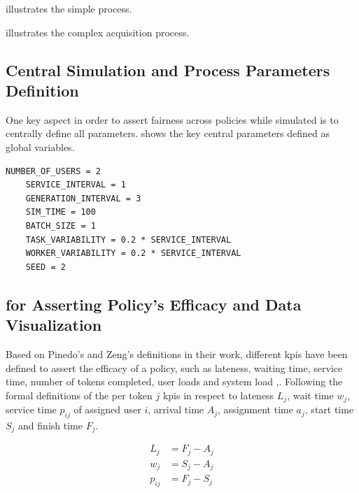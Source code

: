 \documentclass{seal_thesis}
\begin{document}
 illustrates the simple process.


 illustrates the complex acquisition process.


\subsection{Central Simulation and Process Parameters Definition}

One key aspect in order to assert fairness across policies while simulated is to centrally define all parameters.  shows the key central parameters defined as global variables.

\begin{lstlisting}[caption=Central parameters definition that ensures fairness across simulation runs,label=lst:central_parameters,style=CustomPython]
	NUMBER_OF_USERS = 2
	SERVICE_INTERVAL = 1
	GENERATION_INTERVAL = 3
	SIM_TIME = 100
	BATCH_SIZE = 1
	TASK_VARIABILITY = 0.2 * SERVICE_INTERVAL
	WORKER_VARIABILITY = 0.2 * SERVICE_INTERVAL
	SEED = 2
\end{lstlisting}

\subsection{ for Asserting Policy's Efficacy and Data Visualization}

Based on Pinedo's and Zeng's definitions in their work, different \glspl{kpi} have been defined to assert the efficacy of a policy, such as lateness, waiting time, service time, number of tokens completed, user loads and system load \cite{Pinedo2008},\cite{Zeng2005}. Following the formal definitions of the per token $j$ \glspl{kpi} in respect to lateness $L_j$, wait time $w_j$, service time $p_{ij}$ of assigned user $i$, arrival time $A_j$, assignment time $a_j$, start time $S_j$ and finish time $F_j$.

\begin{align}
	L_j&=F_j-A_j \label{eq:lateness}\\
	w_j&=S_j-A_j \\
	p_{ij}&=F_j-S_j
\end{align}
\end{document}
